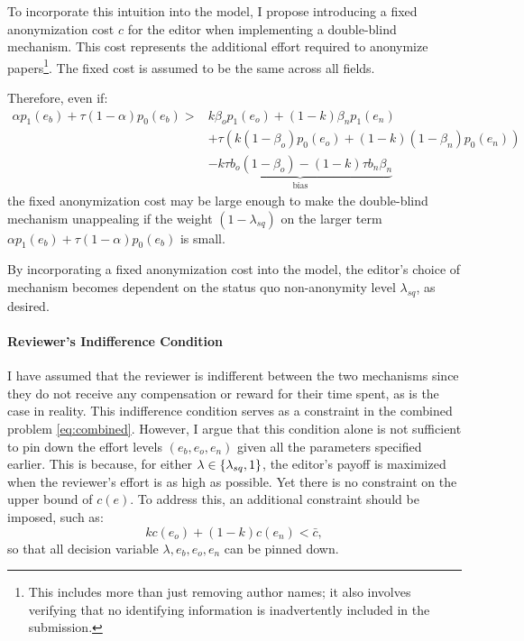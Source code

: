 \documentclass[12pt]{article}
\begin{document}
To incorporate this intuition into the model, I propose introducing a fixed
anonymization cost $c$ for the editor when implementing a double-blind
mechanism. This cost represents the additional effort required to anonymize
papers\footnote{This includes more than just removing author names; it also
    involves verifying that no identifying information is inadvertently included in
    the submission.}. The fixed cost is assumed to be the same across all fields.

Therefore, even if:
\begin{equation*}
    \begin{split}
        \alpha p_1(e_b) + \tau(1-\alpha)p_0(e_b)> &
        k\beta_o p_1(e_o) + (1-k)\beta_n p_1(e_n)   \\ & + \tau(k(1-\beta_o)p_0(e_o) + (1-k)(1-\beta_n)p_0(e_n))\\
                                                  &
        \underbrace{-k\tau b_o(1-\beta_o) - (1-k)\tau b_n\beta_n }_{\text{bias}}
    \end{split}
\end{equation*}
the fixed anonymization cost may be large enough to make the double-blind mechanism unappealing if the weight $(1 - \lambda_{sq})$ on the larger term $\alpha p_1(e_b) + \tau (1 - \alpha) p_0(e_b)$ is small.

By incorporating a fixed anonymization cost into the model, the editor's choice
of mechanism becomes dependent on the status quo non-anonymity level
$\lambda_{sq}$, as desired.

\paragraph{Reviewer's Indifference Condition}
I have assumed that the reviewer is indifferent between the two mechanisms
since they do not receive any compensation or reward for their time spent, as
is the case in reality. This indifference condition serves as a constraint in
the combined problem \ref{eq:combined}. However, I argue that this condition
alone is not sufficient to pin down the effort levels $(e_b, e_o, e_n)$ given
all the parameters specified earlier. This is because, for either $\lambda \in
    \left\{\lambda_{sq}, 1\right\}$, the editor's payoff is maximized when the reviewer's
effort is as high as possible. Yet there is no constraint on the upper bound of
$c(e)$. To address this, an additional constraint should be imposed, such as:
\[
    k c(e_o) + (1 - k) c(e_n) < \bar{c},
\]
so that all decision variable $\lambda, e_b, e_o, e_n$ can be pinned down.
\end{document}
